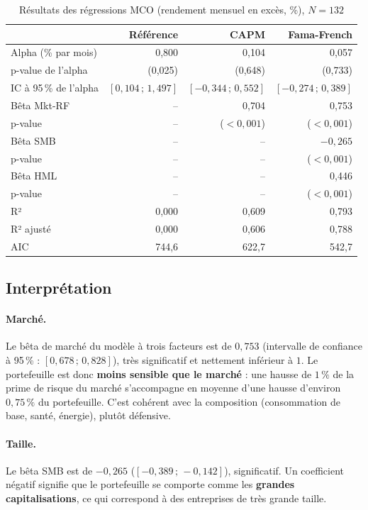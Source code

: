\documentclass[11pt,a4paper]{article}
\begin{document}
\begin{table}[H]
\centering
\caption{Résultats des régressions MCO (rendement mensuel en excès, \%), $N=132$}
\label{tab:modeles}
\begin{tabular}{lrrr}
\toprule
 & Référence & CAPM & Fama-French \\
\midrule
Alpha (\% par mois) & 0,800 & 0,104 & 0,057 \\
\quad p-value de l'alpha & (0,025) & (0,648) & (0,733) \\
\quad IC à 95\,\% de l'alpha & $[0{,}104\,;\,1{,}497]$ & $[-0{,}344\,;\,0{,}552]$ & $[-0{,}274\,;\,0{,}389]$ \\
Bêta Mkt-RF & -- & 0,704 & 0,753 \\
\quad p-value & -- & ($<0{,}001$) & ($<0{,}001$) \\
Bêta SMB & -- & -- & $-0{,}265$ \\
\quad p-value & -- & -- & ($<0{,}001$) \\
Bêta HML & -- & -- & 0,446 \\
\quad p-value & -- & -- & ($<0{,}001$) \\
\midrule
R² & 0,000 & 0,609 & 0,793 \\
R² ajusté & 0,000 & 0,606 & 0,788 \\
AIC & 744,6 & 622,7 & 542,7 \\
\bottomrule
\end{tabular}
\end{table}

\subsection{Interprétation}

\paragraph{Marché.} Le bêta de marché du modèle à trois facteurs est de $0{,}753$ (intervalle de confiance à 95\,\% : $[0{,}678\,;\,0{,}828]$), très significatif et nettement inférieur à $1$. Le portefeuille est donc \textbf{moins sensible que le marché} : une hausse de $1\,\%$ de la prime de risque du marché s'accompagne en moyenne d'une hausse d'environ $0{,}75\,\%$ du portefeuille. C'est cohérent avec la composition (consommation de base, santé, énergie), plutôt défensive.

\paragraph{Taille.} Le bêta SMB est de $-0{,}265$ ($[-0{,}389\,;\,-0{,}142]$), significatif. Un coefficient négatif signifie que le portefeuille se comporte comme les \textbf{grandes capitalisations}, ce qui correspond à des entreprises de très grande taille.
\end{document}
